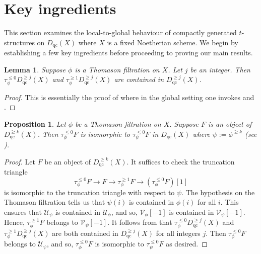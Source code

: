 \documentclass[11pt]{amsart}
\theoremstyle{plain}
\newtheorem{lemma}[theorem]{Lemma}
\newtheorem{proposition}[theorem]{Proposition}
\theoremstyle{definition}
\numberwithin{equation}{section}
\numberwithin{theorem}{section}
\begin{document}
\section{Key ingredients}
\label{sec:key_ingredients}

This section examines the local-to-global behaviour of compactly generated $t$-structures on $D_{\operatorname{qc}}(X)$ where $X$ is a fixed Noetherian scheme. We begin by establishing a few key ingredients before proceeding to proving our main results.

\begin{lemma}\label{lemma:AJS2010_4.2_generalization }
    Suppose $\phi$ is a Thomason filtration on $X$. Let $j$ be an integer. Then $\tau^{\leq 0}_\phi D^{\geq j}_{\operatorname{qc}}(X)$ and $\tau^{\geq 1}_\phi D^{\geq j}_{\operatorname{qc}}(X)$ are contained in $D^{\geq j}_{\operatorname{qc}}(X)$.
\end{lemma}

\begin{proof}
    This is essentially the proof of \cite[Lemma 4.2]{AlonsoTarrio/JeremiasLopez/Saorin:2010} where in the global setting one invokes \cite[Theorem 3.6]{Lank:2025} and \cite[Example 2.1]{Hrbek/Lank/LeGros/Pavon:2026}.
\end{proof}

\begin{proposition}\label{prop:filtrations_agreeing_after_some_point}
    Let $\phi$ be a Thomason filtration on $X$. Suppose $F$ is an object of $D^{\geq k}_{\operatorname{qc}}(X)$. Then $\tau^{\leq 0}_\phi F$ is isomorphic to $\tau^{\leq 0}_\psi F$ in $D_{\operatorname{qc}}(X)$ where $\psi:=\phi^{\geq k}$ (see ).
\end{proposition}

\begin{proof}
    Let $F$ be an object of $D^{\geq k}_{\operatorname{qc}}(X)$. It suffices to check the truncation triangle
    \begin{displaymath}
        \tau^{\leq 0}_\phi F\to F\to \tau^{\geq 1}_\phi F \to (\tau^{\leq 0}_\phi F)[1]
    \end{displaymath}
    is isomorphic to the truncation triangle with respect to $\psi$. The hypothesis on the Thomason filtration tells us that $\psi(i)$ is contained in $\phi(i)$ for all $i$. This ensures that $\mathcal{U}_{\psi}$ is contained in $\mathcal{U}_\phi$, and so, $\mathcal{V}_\phi[-1]$ is contained in $\mathcal{V}_\psi [-1]$. Hence, $\tau^{\geq 1}_\phi F$ belongs to $\mathcal{V}_\psi [-1]$. It follows from  that $\tau_\phi^{\leq 0} D^{\geq j}_{\operatorname{qc}}(X)$ and $\tau_\phi^{\geq 1} D^{\geq j}_{\operatorname{qc}}(X)$ are both contained in $D^{\geq j}_{\operatorname{qc}}(X)$ for all integers $j$. Then $\tau^{\leq 0}_\phi F$ belongs to $\mathcal{U}_\psi$, and so, $\tau^{\leq 0}_\phi  F$ is isomorphic to $\tau^{\leq 0}_\psi F$ as desired.
\end{proof}
\end{document}
